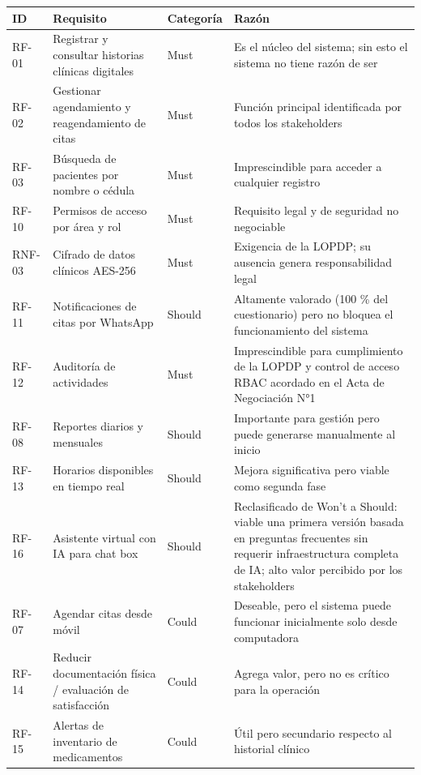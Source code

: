 \documentclass[11pt,a4paper]{article}
\begin{document}
	\begin{longtable}{p{} p{} p{} p{}}
		
		\toprule
		\textbf{ID} &
		\textbf{Requisito} &
		\textbf{Categoría} &
		\textbf{Razón} \\
		\midrule
		\endhead
		
		\bottomrule
		\endlastfoot
		RF-01 & Registrar y consultar historias clínicas digitales & Must & Es el núcleo del sistema; sin esto el sistema no tiene razón de ser \\
		RF-02 & Gestionar agendamiento y reagendamiento de citas & Must & Función principal identificada por todos los stakeholders \\
		RF-03 & Búsqueda de pacientes por nombre o cédula & Must & Imprescindible para acceder a cualquier registro \\
		RF-10 & Permisos de acceso por área y rol & Must & Requisito legal y de seguridad no negociable \\
		RNF-03 & Cifrado de datos clínicos AES-256 & Must & Exigencia de la LOPDP; su ausencia genera responsabilidad legal \\
		RF-11 & Notificaciones de citas por WhatsApp & Should & Altamente valorado (100 \% del cuestionario) pero no bloquea el funcionamiento del sistema \\
		RF-12 & Auditoría de actividades & Must & Imprescindible para cumplimiento de la LOPDP y control de acceso RBAC acordado en el Acta de Negociación N°1 \\
		RF-08 & Reportes diarios y mensuales & Should & Importante para gestión pero puede generarse manualmente al inicio \\
		RF-13 & Horarios disponibles en tiempo real & Should & Mejora significativa pero viable como segunda fase \\
		RF-16 & Asistente virtual con IA para chat box & Should & Reclasificado de Won't a Should: viable una primera versión basada en preguntas frecuentes sin requerir infraestructura completa de IA; alto valor percibido por los stakeholders \\
		RF-07 & Agendar citas desde móvil & Could & Deseable, pero el sistema puede funcionar inicialmente solo desde computadora \\
		RF-14 & Reducir documentación física / evaluación de satisfacción & Could & Agrega valor, pero no es crítico para la operación \\
		RF-15 & Alertas de inventario de medicamentos & Could & Útil pero secundario respecto al historial clínico \\

\end{longtable}
\end{document}
